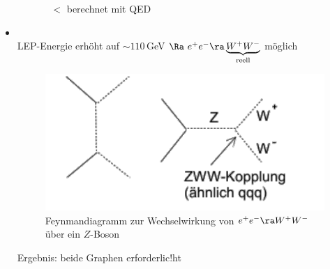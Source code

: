 \begin{itemize}
\begin{itemize}
\begin{itemize}
$\lt$ berechnet mit QED
\end{itemize}
\end{itemize}
\item {}\\
LEP-Energie erhöht auf $\sim 110$\,GeV $\Ra \ e^+e^-\ra \underbrace{W^+W^-}_\text{reell}$ möglich

\begin{figure}[!ht]
\centering
\includegraphics[width=.5\textwidth]{imgs/ep5-fig-8-21.pdf}
\caption{Feynmandiagramm zur Wechselwirkung von $e^+e^- \ra W^+W^-$ über ein $Z$-Boson\label{fig:8.21}}
\end{figure}

Ergebnis: beide Graphen erforderlic!ht
\end{itemize}
